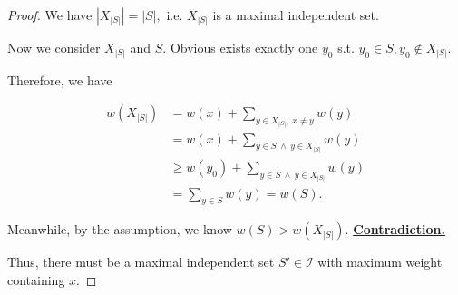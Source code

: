 \documentclass{article}
\begin{document}
\begin{proof}
    \hspace{1.3em}
    We have $\left|X_{|S|}\right|=|S|,$ i.e. $X_{|S|}$ is a maximal independent set.
    
    \vspace{2em} \hspace{1.3em}
    Now we consider $X_{|S|}$ and $S$. Obvious exists exactly one $y_0$ s.t. $y_0\in S, y_0 \notin X_{|S|}.$
    
    \hspace{1.3em}
    Therefore, we have 
    
    \vspace{-2.5em}
    \begin{align*}
        w(X_{|S|}) &= w(x) + \sum_{y\in X_{|S|},\ x\neq y} w(y)\\
        &= w(x) + \sum_{y\in S\ \land\ y\in X_{|S|}} w(y) \\
        & \geq w(y_0) + \sum_{y\in S\ \land\ y\in X_{|S|}} w(y) \\
        &= \sum_{y\in S} w(y) = w(S).
    \end{align*}
    
    \hspace{1.3em}
    Meanwhile, by the assumption, we know $w(S)>w(X_{|S|}).$ \underline{\textbf{Contradiction.}}
    
    \vspace{2em} \hspace{1.3em}
    Thus, there must be a maximal independent set $S'\in\mathcal{I}$ with maximum weight containing $x$.
\end{proof}

\newpage
\end{document}
